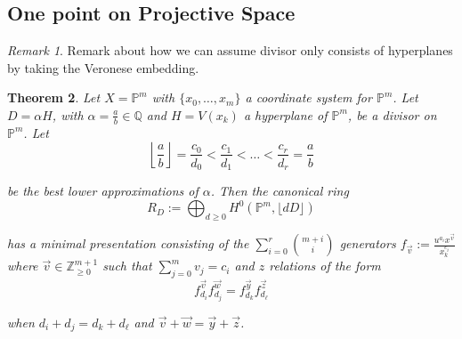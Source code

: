 \documentclass{amsart}
\theoremstyle{plain}
\newtheorem{thm}{Theorem}[section]
\theoremstyle{definition}
\theoremstyle{remark}
\newtheorem{rem}[thm]{Remark}
\numberwithin{equation}{section}
\newcommand\ssec{\subsection}
\newcommand\bq{{\mathbb Q}}
\newcommand\bp{{\mathbb P}}
\newcommand\bz{{\mathbb Z}}
\begin{document}
\ssec{One point on Projective Space}
\label{ssec:proj-one-point}

\begin{rem}
Remark about how we can assume divisor only consists of hyperplanes
by taking the Veronese embedding.
\end{rem}


\begin{thm}
\label{thm:proj-one-point}
Let $X = \bp^m$ with $\{x_0, \ldots, x_m\}$ a coordinate system for
$\bp^m$. Let $D = \alpha H$, with $\alpha = \frac{a}{b} \in \bq$
and $H = V(x_k)$ a hyperplane of $\bp^m$, be a divisor on $\bp^m$.
Let
\[
	\left\lfloor \frac{a}{b} \right\rfloor = \frac{c_0}{d_0} <
	\frac{c_1}{d_1} < \ldots < \frac{c_r}{d_r} = \frac{a}{b}
\]

\noindent
be the best lower approximations of $\alpha$. Then the
canonical ring
\[
	R_D := \bigoplus_{d \geq 0} H^0(\bp^m, \lfloor dD \rfloor)
\]

\noindent
has a minimal presentation consisting of the $\sum_{i = 0}^{r}
{{m + i} \choose {i}}$ generators $f_{\vec{v}} := \frac{u^{a_i}
x^{\vec{v}}}{x_k^{c_i}}$ where $\vec{v} \in \bz_{\geq 0}^{m + 1}$
such that $\sum_{j = 0}^{m} v_j = c_i$ and $z$ 
relations of the form
\[
	f_{d_i}^{\vec{v}} f_{d_j}^{\vec{w}} = f_{d_k}^{\vec{y}} f_{d_\ell}^{\vec{z}}
\]

\noindent
when $d_i + d_j = d_k + d_\ell$ and $\vec{v} + \vec{w} = \vec{y} +
\vec{z}$.
\end{thm}
\end{document}
